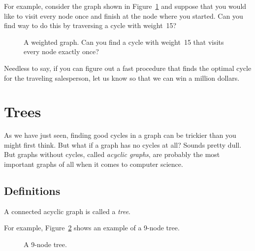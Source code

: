 For example, consider the graph shown in Figure~\ref{fig:5AL} and
suppose that you would like to visit every node once and finish at the
node where you started.  Can you find  way to do this by traversing a
cycle with weight~15?

\begin{figure}


\caption{A weighted graph.  Can you find a cycle with weight~15 that
  visits every node exactly once?}

\label{fig:5AL}
\end{figure}

Needless to say, if you can figure out a fast procedure that finds the
optimal cycle for the traveling salesperson, let us know so that we
can win a million dollars.

\begin{problems}
\examproblems
{}

\homeworkproblems
{}
\end{problems}

\section{Trees}\label{trees-sec}

As we have just seen, finding good cycles in a graph can be trickier than
you might first think.  But what if a graph has no cycles at all?  Sounds
pretty dull.  But graphs without cycles, called \emph{acyclic graphs}, are
probably the most important graphs of all when it comes to computer
science.

\subsection{Definitions}

\begin{definition}\label{def:tree}
A connected acyclic graph is called a \emph{tree}.
\end{definition}

For example, Figure~\ref{fig:5H} shows an example of a 9-node tree.

\begin{figure}


\caption{A 9-node tree.}
\label{fig:5H}
\end{figure}

